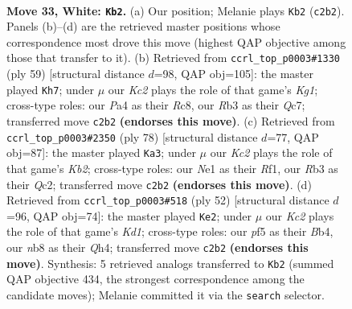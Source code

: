 \documentclass[11pt]{article}
\begin{document}
\clearpage

\begin{figure}[p]\centering
\begin{subfigure}{0.46\textwidth}\centering
\resizebox{\linewidth}{!}{%
\newchessgame
\chessboard[
  setfen={1n3r1k/2pnq2p/rp2p1p1/p3Pp2/P2P1P1P/1RP3N1/2K3PQ/4NR2 w - - 7 33},
  showmover=false,
  pgfstyle=straightmove, color=movearrow, markmove={c2-b2}
]}
\caption{}
\end{subfigure}\hfill
\begin{subfigure}{0.46\textwidth}\centering
\resizebox{\linewidth}{!}{%
\newchessgame
\chessboard[
  setfen={2r3k1/2qr1pp1/pp1ppnnp/8/2P1P3/1PNRQN1P/P4PP1/3R2K1 b - - 5 30},
  showmover=false,
  pgfstyle=straightmove, color=movearrow, markmove={g8-h7}
]}
\caption{}
\end{subfigure}
\\[4pt]
\begin{subfigure}{0.46\textwidth}\centering
\resizebox{\linewidth}{!}{%
\newchessgame
\chessboard[
  setfen={3qrnk1/5rp1/3p2n1/pNpPppP1/P1P4p/1P3P1N/1KQ4P/4RR2 w - - 14 40},
  showmover=false,
  pgfstyle=straightmove, color=movearrow, markmove={b2-a3}
]}
\caption{}
\end{subfigure}\hfill
\begin{subfigure}{0.46\textwidth}\centering
\resizebox{\linewidth}{!}{%
\newchessgame
\chessboard[
  setfen={4q1r1/1knr1npp/p3p3/Pp1pPp1P/1BpP1N1Q/2P3R1/2P2PP1/3K3R w - - 18 27},
  showmover=false,
  pgfstyle=straightmove, color=movearrow, markmove={d1-e2}
]}
\caption{}
\end{subfigure}
\caption{\textbf{Move 33, White: \texttt{Kb2}.} (a) Our position; Melanie plays \texttt{Kb2} (\texttt{c2b2}). Panels (b)--(d) are the retrieved master positions whose correspondence most drove this move (highest QAP objective among those that transfer to it). (b) Retrieved from \texttt{ccrl\_top\_p0003\#1330} (ply 59) [structural distance $d$=98, QAP obj=105]: the master played \texttt{Kh7}; under $\mu$ our \emph{Kc2} plays the role of that game's \emph{Kg1}; cross-type roles: our \emph{P}a4 as their \emph{R}c8, our \emph{R}b3 as their \emph{Q}c7; transferred move \texttt{c2b2} \textbf{(endorses this move)}. (c) Retrieved from \texttt{ccrl\_top\_p0003\#2350} (ply 78) [structural distance $d$=77, QAP obj=87]: the master played \texttt{Ka3}; under $\mu$ our \emph{Kc2} plays the role of that game's \emph{Kb2}; cross-type roles: our \emph{N}e1 as their \emph{R}f1, our \emph{R}b3 as their \emph{Q}c2; transferred move \texttt{c2b2} \textbf{(endorses this move)}. (d) Retrieved from \texttt{ccrl\_top\_p0003\#518} (ply 52) [structural distance $d$=96, QAP obj=74]: the master played \texttt{Ke2}; under $\mu$ our \emph{Kc2} plays the role of that game's \emph{Kd1}; cross-type roles: our \emph{p}f5 as their \emph{B}b4, our \emph{n}b8 as their \emph{Q}h4; transferred move \texttt{c2b2} \textbf{(endorses this move)}. Synthesis: 5 retrieved analogs transferred to \texttt{Kb2} (summed QAP objective 434, the strongest correspondence among the candidate moves); Melanie committed it via the \texttt{search} selector.}
\label{fig:thought-m64}
\end{figure}
\end{document}
